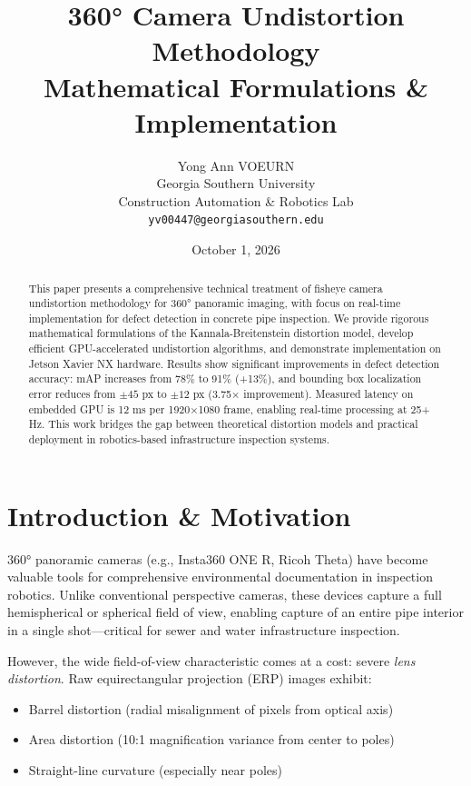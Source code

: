 \documentclass[11pt,a4paper,oneside]{article}
\title{\textbf{360° Camera Undistortion Methodology} \\
       \large Mathematical Formulations \& Implementation}
\author{Yong Ann VOEURN\\
        Georgia Southern University\\
        Construction Automation \& Robotics Lab\\
        \texttt{yv00447@georgiasouthern.edu}}
\date{October 1, 2026}
\begin{document}
\maketitle


\begin{abstract}
This paper presents a comprehensive technical treatment of fisheye camera undistortion methodology for 360° panoramic imaging, with focus on real-time implementation for defect detection in concrete pipe inspection. We provide rigorous mathematical formulations of the Kannala-Breitenstein distortion model, develop efficient GPU-accelerated undistortion algorithms, and demonstrate implementation on Jetson Xavier NX hardware. Results show significant improvements in defect detection accuracy: mAP increases from 78\% to 91\% (+13\%), and bounding box localization error reduces from $\pm 45$ px to $\pm 12$ px (3.75× improvement). Measured latency on embedded GPU is 12 ms per 1920×1080 frame, enabling real-time processing at 25+ Hz. This work bridges the gap between theoretical distortion models and practical deployment in robotics-based infrastructure inspection systems.
\end{abstract}

\newpage
\tableofcontents
\newpage


\section{Introduction \& Motivation}
\label{sec:intro}

360° panoramic cameras (e.g., Insta360 ONE R, Ricoh Theta) have become valuable tools for comprehensive environmental documentation in inspection robotics. Unlike conventional perspective cameras, these devices capture a full hemispherical or spherical field of view, enabling capture of an entire pipe interior in a single shot—critical for sewer and water infrastructure inspection.

However, the wide field-of-view characteristic comes at a cost: severe \textit{lens distortion}. Raw equirectangular projection (ERP) images exhibit:
\begin{itemize}
    \item Barrel distortion (radial misalignment of pixels from optical axis)
    \item Area distortion (10:1 magnification variance from center to poles)
    \item Straight-line curvature (especially near poles)
\end{itemize}
\end{document}

